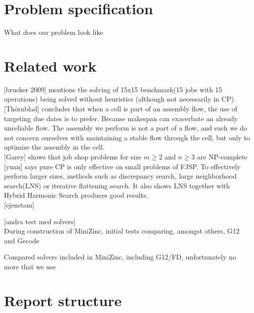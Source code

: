 \section{Problem specification}
What does our problem look like

\section{Related work}
[brucker 2009] mentions the solving of 15x15 benchmark(15 jobs with 15 operations) being solved without heuristics (although not necessarily in CP).\cite{brucker_2009}
\\

[Thörnblad] concludes that when a cell is part of an assembly flow, the use of targeting due dates is to prefer. Because makespan can exacerbate an already unreliable flow. The assembly we perform is not a part of a flow, and such we do not concern ourselves with maintaining a stable flow through the cell, but only to optimize the assembly in the cell.\cite{thornblad_2013}
\\

[Garey] shows that job shop problems for size $m \geq 2$ and $n \geq 3$ are NP-complete \cite{garey_1976}
\\

[yuan] says pure CP is only effective on small problems of FJSP. To effectively perform larger sizes, methods such as discrepancy search, large neighborhood search(LNS) or iterative flattening search. It also shows LNS together with Hybrid Harmonic Search produces good results.\cite{yuan_2013}
\\

[ejenstam]\cite{ejenstam_2014}

[andra test med solvers]\\
During construction of MiniZinc, initial tests comparing, amongst others, G12 and Gecode\cite{mz_paper}

Compared solvers included in MiniZinc, including G12/FD, unfortunately no more that we use\cite{nicta_2964}

\section{Report structure}
